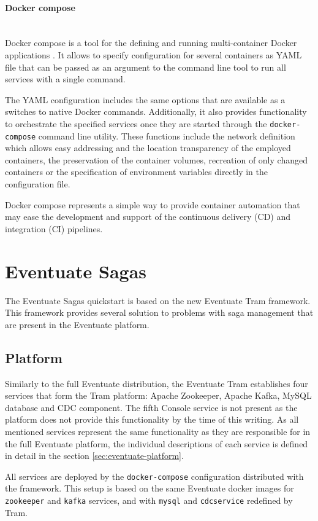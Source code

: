 \documentclass[oneside,
  digital, %
  table,   %
  nolof,     %
  nolot,     %
]{fithesis3}
\newcommand{\newlinepar}[1]{\paragraph{#1}\needspace{4\baselineskip}\mbox{}\\}
\begin{document}
\newlinepar{Docker compose}

Docker compose is a tool for the defining and running multi-container Docker applications \cite{docker_compose}. It allows to specify configuration for several containers as YAML file that can be passed as an argument to the command line tool to run all services with a single command.

The YAML configuration includes the same options that are available as a switches to native Docker commands. Additionally, it also provides functionality to orchestrate the specified services once they are started through the \texttt{docker-compose} command line utility. These functions include the network definition which allows easy addressing and the location transparency of the employed containers, the preservation of the container volumes, recreation of only changed containers or the specification of environment variables directly in the configuration file. 

Docker compose represents a simple way to provide container automation that may ease the development and support of the continuous delivery (CD) and integration (CI) pipelines.

\section{Eventuate Sagas}

The Eventuate Sagas quickstart is based on the new Eventuate Tram framework. This framework provides several solution to problems with saga management that are present in the Eventuate platform.

\subsection{Platform}

Similarly to the full Eventuate distribution, the Eventuate Tram establishes four services that form the Tram platform: Apache Zookeeper, Apache Kafka, MySQL database and CDC component. The fifth Console service is not present as the platform does not provide this functionality by the time of this writing. As all mentioned services represent the same functionality as they are responsible for in the full Eventuate platform, the individual descriptions of each service is defined in detail in the section \ref{sec:eventuate-platform}.  

All services are deployed by the \texttt{docker-compose} configuration distributed with the framework. This setup is based on the same Eventuate docker images for \texttt{zookeeper} and \texttt{kafka} services, and with \texttt{mysql} and \texttt{cdcservice} redefined by Tram.
\end{document}
